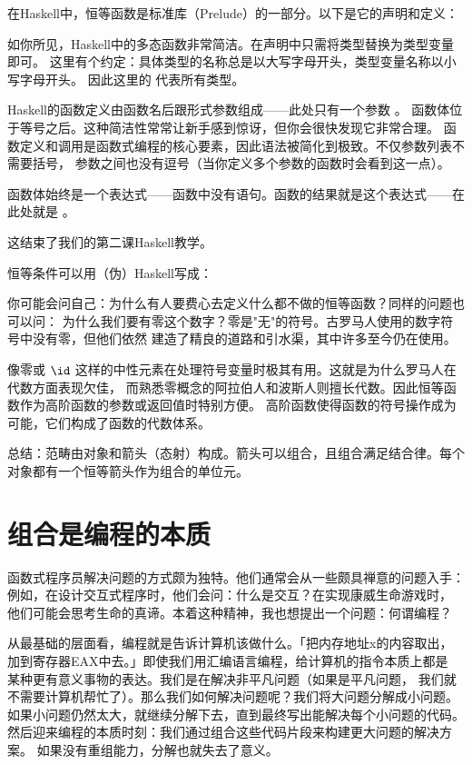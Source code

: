 在Haskell中，恒等函数是标准库（Prelude）的一部分。以下是它的声明和定义：

如你所见，Haskell中的多态函数非常简洁。在声明中只需将类型替换为类型变量即可。
这里有个约定：具体类型的名称总是以大写字母开头，类型变量名称以小写字母开头。
因此这里的  代表所有类型。

Haskell的函数定义由函数名后跟形式参数组成——此处只有一个参数 。
函数体位于等号之后。这种简洁性常常让新手感到惊讶，但你会很快发现它非常合理。
函数定义和调用是函数式编程的核心要素，因此语法被简化到极致。不仅参数列表不需要括号，
参数之间也没有逗号（当你定义多个参数的函数时会看到这一点）。

函数体始终是一个表达式——函数中没有语句。函数的结果就是这个表达式——在此处就是 。

这结束了我们的第二课Haskell教学。

恒等条件可以用（伪）Haskell写成：

你可能会问自己：为什么有人要费心去定义什么都不做的恒等函数？同样的问题也可以问：
为什么我们要有零这个数字？零是"无"的符号。古罗马人使用的数字符号中没有零，但他们依然
建造了精良的道路和引水渠，其中许多至今仍在使用。

像零或 $\id$ 这样的中性元素在处理符号变量时极其有用。这就是为什么罗马人在代数方面表现欠佳，
而熟悉零概念的阿拉伯人和波斯人则擅长代数。因此恒等函数作为高阶函数的参数或返回值时特别方便。
高阶函数使得函数的符号操作成为可能，它们构成了函数的代数体系。

总结：范畴由对象和箭头（态射）构成。箭头可以组合，且组合满足结合律。每个对象都有一个恒等箭头作为组合的单位元。

\section{组合是编程的本质}

函数式程序员解决问题的方式颇为独特。他们通常会从一些颇具禅意的问题入手：
例如，在设计交互式程序时，他们会问：什么是交互？在实现康威生命游戏时，
他们可能会思考生命的真谛。本着这种精神，我也想提出一个问题：何谓编程？

从最基础的层面看，编程就是告诉计算机该做什么。「把内存地址x的内容取出，
加到寄存器EAX中去。」即使我们用汇编语言编程，给计算机的指令本质上都是
某种更有意义事物的表达。我们是在解决非平凡问题（如果是平凡问题，
我们就不需要计算机帮忙了）。那么我们如何解决问题呢？我们将大问题分解成小问题。
如果小问题仍然太大，就继续分解下去，直到最终写出能解决每个小问题的代码。
然后迎来编程的本质时刻：我们通过组合这些代码片段来构建更大问题的解决方案。
如果没有重组能力，分解也就失去了意义。

